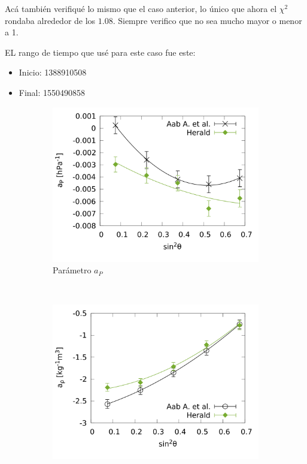       Acá también verifiqué lo mismo que el caso anterior, lo único que ahora el $\chi^2$ rondaba alrededor de los $1.08$. Siempre verifico que no sea mucho mayor o menor a 1.

      EL rango de tiempo que usé para este caso fue este: 
      \begin{itemize}
        \item Inicio: 1388910508
        \item Final: 1550490858
      \end{itemize}
      
        \begin{figure}[H]
          \centering
          \begin{subfigure}[b]{0.5\textwidth}
          \includegraphics[width=\linewidth]{../03_IntroduccionReport/params/ap_2020_above_1EeV.png}
          \caption{Parámetro $a_P$ }
          \label{fig:ap_2020_1EeV}
          \end{subfigure}\\
          \begin{subfigure}[b]{0.5\textwidth}
          \includegraphics[width=\linewidth]{../03_IntroduccionReport/params/arho_2020_above_1EeV.png}

\end{subfigure}
\end{figure}
